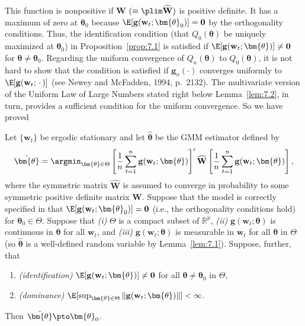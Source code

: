 This function is nonpositive if $\mathbf{W}$ $(\equiv \plim \widehat{\mathbf{W}})$ is positive definite. It has a maximum of zero at $\bm{\theta}_0$ because $\E[\mathbf{g}(\mathbf{w}_t; \bm{\theta}_0)] = \mathbf{0}$ by the orthogonality conditions. Thus, the identification condition (that $Q_0(\bm{\theta})$ be uniquely maximized at $\bm{\theta}_0$) in Proposition~\ref{prop:7.1} is satisfied if $\E[\mathbf{g}(\mathbf{w}_t; \bm{\theta})] \neq \mathbf{0}$ for $\bm{\theta} \neq \bm{\theta}_0$. Regarding the uniform convergence of $Q_n(\bm{\theta})$ to $Q_0(\bm{\theta})$, it is not hard to show that the condition is satisfied if $\mathbf{g}_n(\cdot)$ converges uniformly to $\E[\mathbf{g}(\mathbf{w}_t; \,\cdot\,)]$ (see Newey and McFadden, 1994, p.~2132). The multivariate version of the Uniform Law of Large Numbers stated right below Lemma~\ref{lem:7.2}, in turn, provides a sufficient condition for the uniform convergence. So we have proved

\begin{proposition}
\label{prop:7.7}
Let $\{\mathbf{w}_t\}$ be ergodic stationary and let $\hat{\bm{\theta}}$ be the GMM estimator defined by
\[
\hat{\bm{\theta}} = \argmin_{\bm{\theta} \in \Theta} \left[ \frac{1}{n} \sum_{t=1}^{n} \mathbf{g}(\mathbf{w}_t; \bm{\theta}) \right]' \widehat{\mathbf{W}} \left[ \frac{1}{n} \sum_{t=1}^{n} \mathbf{g}(\mathbf{w}_t; \bm{\theta}) \right],
\]
where the symmetric matrix $\widehat{\mathbf{W}}$ is assumed to converge in probability to some symmetric positive definite matrix $\mathbf{W}$. Suppose that the model is correctly specified in that $\E[\mathbf{g}(\mathbf{w}_t; \bm{\theta}_0)] = \mathbf{0}$ (i.e., the orthogonality conditions hold) for $\bm{\theta}_0 \in \Theta$. Suppose that \emph{(i)} $\Theta$ is a compact subset of $\mathbb{R}^p$, \emph{(ii)} $\mathbf{g}(\mathbf{w}_t; \bm{\theta})$ is continuous in $\bm{\theta}$ for all $\mathbf{w}_t$, and \emph{(iii)} $\mathbf{g}(\mathbf{w}_t; \bm{\theta})$ is measurable in $\mathbf{w}_t$ for all $\bm{\theta}$ in $\Theta$ (so $\hat{\bm{\theta}}$ is a well-defined random variable by Lemma~\ref{lem:7.1}). Suppose, further, that
\begin{enumerate}[label=(\alph*)]
\item \emph{(identification)} \enspace $\E[\mathbf{g}(\mathbf{w}_t; \bm{\theta})] \neq \mathbf{0}$ for all $\bm{\theta} \neq \bm{\theta}_0$ in $\Theta$,
\item \emph{(dominance)} \enspace $\E[\sup_{\bm{\theta} \in \Theta} \| \mathbf{g}(\mathbf{w}_t; \bm{\theta}) \|] < \infty$.
\end{enumerate}
Then $\hat{\bm{\theta}} \pto \bm{\theta}_0$.
\end{proposition}

